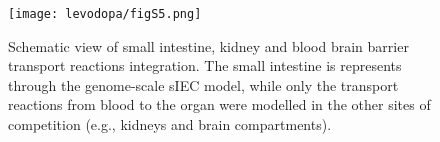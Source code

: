 \begin{figure}[!htp]
\centering
	\texttt{[image: levodopa/figS5.png]}%
	\caption[Intestine, kidney, and brain simplified network of levodopa.]{Schematic view of small intestine, kidney and blood brain barrier transport reactions integration. The small intestine is represents through the genome-scale sIEC model, while only the transport reactions from blood to the organ were modelled in the other sites of competition (e.g., kidneys and brain compartments). }
	\label{fig:s5levo}
\end{figure}
